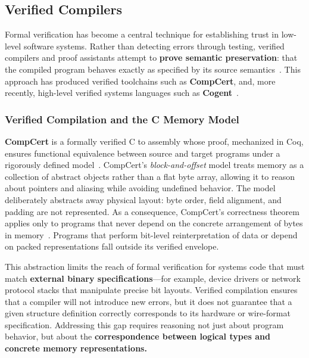 
\subsection{Verified Compilers}
Formal verification has become a central technique for establishing trust
in low-level software systems. Rather than detecting errors through testing,
verified compilers and proof assistants attempt to \textbf{prove
semantic preservation}: that the compiled program behaves exactly as
specified by its source semantics~\autocite{leroy2012compcert}. This
approach has produced verified toolchains such as \textbf{CompCert}, and,
more recently, high-level verified systems languages such as
\textbf{Cogent}~\autocite{cogent1}.

\subsubsection{Verified Compilation and the C Memory Model}
\textbf{CompCert} is a formally verified C to assembly whose proof,
mechanized in Coq, ensures functional equivalence between source and 
target programs under a rigorously defined
model~\autocite{leroy2012compcert,compcert,tolmach2024defining}.
CompCert's \textit{block-and-offset} model treats memory as
a  collection of abstract objects rather than a flat byte array, allowing it
to reason about pointers and aliasing while avoiding undefined behavior. The 
model deliberately abstracts away physical layout: byte order, field alignment,
and padding are not represented. As a consequence, CompCert's correctness
theorem applies only to programs that never depend on the concrete
arrangement of bytes in memory~\autocite{tolmach2024defining}.
Programs that perform bit-level reinterpretation of data or depend on packed
representations fall outside its verified envelope.

This abstraction limits the reach of formal verification for systems
code that must match \textbf{external binary specifications}—for example,
device drivers or network protocol stacks that manipulate precise bit layouts.
Verified compilation ensures that a compiler will not introduce new errors,
but it does not guarantee that a given structure definition correctly
corresponds to its hardware or wire-format specification. Addressing this
gap requires reasoning not just about program behavior, but
about the \textbf{correspondence between logical types and concrete 
memory representations.}


